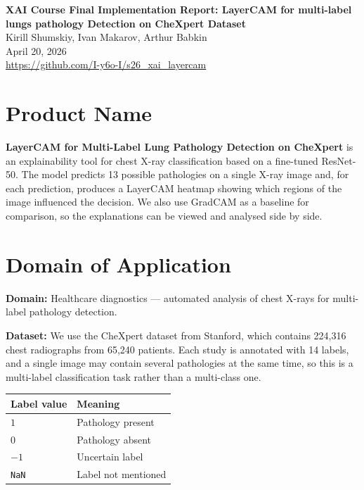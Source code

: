 \documentclass[12pt]{article}
\begin{document}
\begin{center}
    {\LARGE \textbf{XAI Course Final Implementation Report: LayerCAM for multi-label lungs pathology Detection on CheXpert Dataset}} \\[1.2em]
    {\large Kirill Shumskiy, Ivan Makarov, Arthur Babkin} \\[0.6em]
    {\large April 20, 2026} \\[0.4em]
    {\small \url{https://github.com/I-y6o-I/s26_xai_layercam}}
\end{center}

\section{Product Name}

\textbf{LayerCAM for Multi-Label Lung Pathology Detection on CheXpert} is an explainability tool for chest X-ray classification based on a fine-tuned ResNet-50. The model predicts 13 possible pathologies on a single X-ray image and, for each prediction, produces a LayerCAM heatmap showing which regions of the image influenced the decision. We also use GradCAM as a baseline for comparison, so the explanations can be viewed and analysed side by side.

\section{Domain of Application}

\textbf{Domain:} Healthcare diagnostics --- automated analysis of chest X-rays for multi-label pathology detection.

\textbf{Dataset:} We use the CheXpert dataset from Stanford, which contains 224,316 chest radiographs from 65,240 patients. Each study is annotated with 14 labels, and a single image may contain several pathologies at the same time, so this is a multi-label classification task rather than a multi-class one.

\begin{center}
\begin{tabular}{ll}
\toprule
\textbf{Label value} & \textbf{Meaning} \\
\midrule
$1$          & Pathology present \\
$0$          & Pathology absent \\
$-1$         & Uncertain label \\
\texttt{NaN} & Label not mentioned \\
\bottomrule
\end{tabular}
\end{center}
\end{document}
